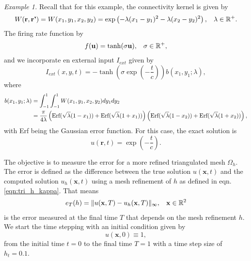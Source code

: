 \documentclass{uonmathreport}
\begin{document}
\textit{Example 1.} Recall that for this example, the connectivity kernel is given by
\begin{equation}\label{eqn:tri_test1_W}
W(\textbf{r},\textbf{r'}) = W(x_1,y_1,x_2,y_2) = \exp\left(-\lambda (x_1- y_1)^2 - \lambda (x_2-y_2)^2\right), \hspace{3mm} \lambda \in \mathbb{R}^+.
\end{equation}
The firing rate function by
\begin{equation}\label{eqn:tri_test1_frate}
f(\mathbf{u}) = \tanh(\sigma \mathbf{u}), \hspace{3mm} \sigma \in \mathbb{R}^+,
\end{equation}
and we incorporate en external input $I_{ext}$ given by
\begin{equation}\label{eqn:tri_test1_Iext}
I_{ext}(x,y,t) = -\tanh\left( \sigma \exp \left( -\frac{t}{c}\right)\right) b(x_1,y_1;\lambda),
\end{equation}
where
\begin{equation}\label{eqn:tri_test1_b}
\begin{split}
b(x_1,y_1;\lambda) &= \int_{-1}^{1} \int_{-1}^{1} W(x_1,y_1,x_2,y_2)dy_1dy_2\\
&=\frac{\pi}{4\lambda}\left( \textnormal{Erf}(\sqrt{\lambda}(1-x_1)) + \textnormal{Erf}(\sqrt{\lambda}(1+x_1))\right) \left( \textnormal{Erf}(\sqrt{\lambda}(1-x_2)) + \textnormal{Erf}(\sqrt{\lambda}(1+x_2))\right),
\end{split}
\end{equation}
with Erf being the Gaussian error function.
For this case, the exact solution is
\begin{equation}\label{eqn:tri_test1_exactsol}
u(\textbf{r}, t) = \exp \left( - \frac{t}{c}\right).
\end{equation}

The objective is to measure the error for a more refined triangulated mesh $\Omega_h$. The error is defined as the difference between the true solution $u(\mathbf{x}, t)$ and the computed solution $u_h(\mathbf{x}, t)$ using a mesh refinement of $h$ as defined in eqn.\ref{eqn:tri_h_kappa}. That means
\begin{equation}\label{eqn:tri_numexp_errormeasure}
	e_T(h) = \| u(\mathbf{x}, T) -  u_h(\mathbf{x}, T)\|_{\infty}, \hspace{3mm} \mathbf{x}\in\mathbb{R}^2
\end{equation}
is the error measured at the final time $T$ that depends on the mesh refinement $h$. We start the time stepping with an initial condition given by
\begin{equation}
	u(\mathbf{x}, 0) \equiv 1,
\end{equation}
from the initial time $t=0$ to the final time $T=1$ with a time step size of $h_t = 0.1$.
\end{document}
